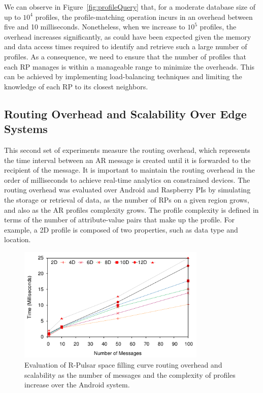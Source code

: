 We can observe in Figure~\ref{fig:profileQuery} that, for a moderate database size of up to $10^4$ profiles, the profile-matching operation incurs in an overhead between five and 10 milliseconds. Nonetheless, when we increase to $10^5$ profiles, the overhead increases significantly, as could have been expected given the memory and data access times required to identify and retrieve such a large number of profiles. As a consequence, we need to ensure that the number of profiles that each RP manages is within a manageable range to minimize the overheads. This can be achieved by implementing load-balancing techniques and limiting the knowledge of each RP to its closest neighbors. 


\subsection{Routing Overhead and Scalability Over Edge Systems}

This second set of experiments measure the routing overhead, which represents the time interval between an AR message is created until it is forwarded to the recipient of the message. It is important to maintain the routing overhead in the order of milliseconds to achieve real-time analytics on constrained devices. The routing overhead was evaluated over Android and Raspberry PIs by simulating the storage or retrieval of data, as the number of RPs on a given region grows, and also as the AR profiles complexity grows. The profile complexity is defined in terms of the number of attribute-value pairs that make up the profile. For example, a 2D profile is composed of two properties, such as data type and location.

\begin{figure}[h!]
  \centering
  \includegraphics[width=0.8\textwidth]{Results/Phone}
  \caption{Evaluation of R-Pulsar space filling curve routing overhead and scalability as the number of messages and the complexity of profiles increase over the Android system.}
  \label{fig:Phone}
\end{figure}

